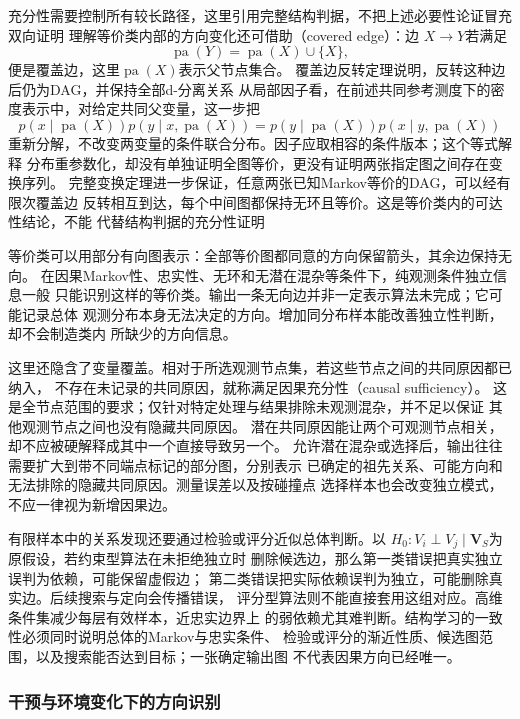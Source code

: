 充分性需要控制所有较长路径，这里引用完整结构判据，不把上述必要性论证冒充
双向证明
理解等价类内部的方向变化还可借助（covered edge）：边
\(X\to Y\)若满足
\[
  \operatorname{pa}(Y)=\operatorname{pa}(X)\cup\{X\},
\]
便是覆盖边，这里\(\operatorname{pa}(X)\)表示父节点集合。
覆盖边反转定理说明，反转这种边后仍为DAG，并保持全部d-分离关系
从局部因子看，在前述共同参考测度下的密度表示中，对给定共同父变量，这一步把
\[
  p(x\mid\operatorname{pa}(X))
  p(y\mid x,\operatorname{pa}(X))
  =
  p(y\mid\operatorname{pa}(X))
  p(x\mid y,\operatorname{pa}(X))
\]
重新分解，不改变两变量的条件联合分布。因子应取相容的条件版本；这个等式解释
分布重参数化，却没有单独证明全图等价，更没有证明两张指定图之间存在变换序列。
完整变换定理进一步保证，任意两张已知Markov等价的DAG，可以经有限次覆盖边
反转相互到达，每个中间图都保持无环且等价。这是等价类内的可达性结论，不能
代替结构判据的充分性证明

等价类可以用部分有向图表示：全部等价图都同意的方向保留箭头，其余边保持无向。
在因果Markov性、忠实性、无环和无潜在混杂等条件下，纯观测条件独立信息一般
只能识别这样的等价类。输出一条无向边并非一定表示算法未完成；它可能记录总体
观测分布本身无法决定的方向。增加同分布样本能改善独立性判断，却不会制造类内
所缺少的方向信息。

这里还隐含了变量覆盖。相对于所选观测节点集，若这些节点之间的共同原因都已纳入，
不存在未记录的共同原因，就称满足因果充分性（causal sufficiency）。
这是全节点范围的要求；仅针对特定处理与结果排除未观测混杂，并不足以保证
其他观测节点之间也没有隐藏共同原因。
潜在共同原因能让两个可观测节点相关，却不应被硬解释成其中一个直接导致另一个。
允许潜在混杂或选择后，输出往往需要扩大到带不同端点标记的部分图，分别表示
已确定的祖先关系、可能方向和无法排除的隐藏共同原因。测量误差以及按碰撞点
选择样本也会改变独立模式，不应一律视为新增因果边。

有限样本中的关系发现还要通过检验或评分近似总体判断。以
\(H_0:V_i\perp V_j\mid\bm V_S\)为原假设，若约束型算法在未拒绝独立时
删除候选边，那么第一类错误把真实独立误判为依赖，可能保留虚假边；
第二类错误把实际依赖误判为独立，可能删除真实边。后续搜索与定向会传播错误，
评分型算法则不能直接套用这组对应。高维条件集减少每层有效样本，近忠实边界上
的弱依赖尤其难判断。结构学习的一致性必须同时说明总体的Markov与忠实条件、
检验或评分的渐近性质、候选图范围，以及搜索能否达到目标；一张确定输出图
不代表因果方向已经唯一。

\subsubsection{干预与环境变化下的方向识别}
\label{sec:causal-interventional-structure}


